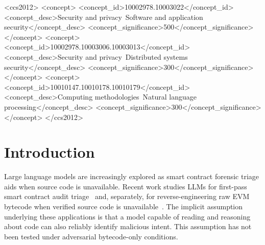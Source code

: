 \documentclass[sigconf]{acmart}
\begin{document}
\begin{CCSXML}
<ccs2012>
   <concept>
       <concept_id>10002978.10003022</concept_id>
       <concept_desc>Security and privacy~Software and application security</concept_desc>
       <concept_significance>500</concept_significance>
       </concept>
   <concept>
       <concept_id>10002978.10003006.10003013</concept_id>
       <concept_desc>Security and privacy~Distributed systems security</concept_desc>
       <concept_significance>300</concept_significance>
       </concept>
   <concept>
       <concept_id>10010147.10010178.10010179</concept_id>
       <concept_desc>Computing methodologies~Natural language processing</concept_desc>
       <concept_significance>300</concept_significance>
       </concept>
 </ccs2012>
\end{CCSXML}



\maketitle

\section{Introduction}\label{sec:intro}

Large language models are increasingly explored as smart contract forensic
triage aids when source code is unavailable. Recent work studies LLMs for
first-pass smart contract audit triage~\cite{david2023manual, ince2026gendetect}
and, separately, for reverse-engineering raw EVM bytecode when verified
source code is unavailable~\cite{david2025decompiling}. The
implicit assumption underlying these applications is that a model capable of
reading and reasoning about code can also reliably identify malicious intent.
This assumption has not been tested under adversarial bytecode-only
conditions.
\end{document}
